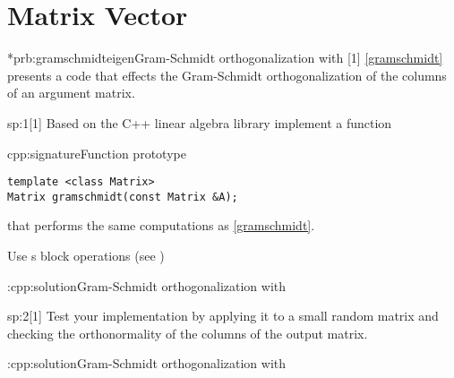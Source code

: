 \chapter{Matrix Vector}

\begin{samproblem}*{prb:gramschmidteigen}{Gram-Schmidt orthogonalization with \eigen{}}[1]{
\cref{gramschmidt} presents a \matlab{} code that effects the Gram-Schmidt
  orthogonalization of the columns of an argument matrix. 
}

\begin{subproblem}{sp:1}[1]
  Based on the C++ linear algebra library \eigen{} implement a function

  \begin{samcode}[C++-code]{cpp:signature}{Function prototype}
    \begin{lstlisting}[style=cpp]
template <class Matrix>  
Matrix gramschmidt(const Matrix &A);
    \end{lstlisting}
  \end{samcode}
  that performs the same computations as \cref{gramschmidt}. 

  \begin{samhint}
    Use \eigen{}s block operations (see \href{https://eigen.tuxfamily.org/dox/group__TutorialBlockOperations.html}{\ExternalLinkSymb})
  \end{samhint}

  \begin{samsolution}
    \begin{samcode}[C++-code]{\cpl:cpp:solution}{Gram-Schmidt orthogonalization with \eigen{}}
      
    \end{samcode}
  \end{samsolution}

\end{subproblem}

\begin{subproblem}{sp:2}[1]
  \label{sp:strassen:2}
  Test your implementation by applying it to a small random matrix
  and checking the orthonormality of the columns of the output
  matrix.

  \begin{samsolution}
    \begin{samcode}[C++-code]{\cpl:cpp:solution}{Gram-Schmidt orthogonalization with \eigen{}}
    \end{samcode}
  \end{samsolution}

\end{subproblem}

\end{samproblem}

 
